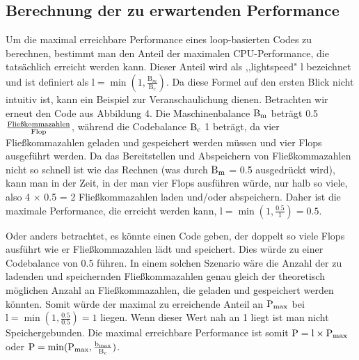 \documentclass[sigconf,language=ngerman]{acmart}
\begin{document}
    \subsection{Berechnung der zu erwartenden Performance}
    Um die maximal erreichbare Performance eines loop-basierten Codes zu berechnen, 
    bestimmt man den Anteil der maximalen CPU-Performance, die tatsächlich erreicht werden kann. 
    Dieser Anteil wird als ,,lightspeed" $\text{l}$ bezeichnet und ist definiert als 
    $\text{l} = \min(1, \frac{\text{B}_{m}}{\text{B}_{c}})$. 
    Da diese Formel auf den ersten Blick nicht intuitiv ist, 
    kann ein Beispiel zur Veranschaulichung dienen. 
    Betrachten wir erneut den Code aus Abbildung 4. 
    Die Maschinenbalance $\textnormal{B}_{\textnormal{m}}$ 
    beträgt 0.5 $\frac{\textnormal{Fließkommazahlen}}{\textnormal{Flop}}$, 
    während die Codebalance $\textnormal{B}_{\textnormal{c}}$ 1 beträgt, 
    da vier Fließkommazahlen geladen und gespeichert werden müssen und vier Flops ausgeführt werden. 
    Da das Bereitstellen und Abspeichern von Fließkommazahlen nicht so schnell ist wie das Rechnen 
    (was durch $\textnormal{B}_{\textnormal{m}}$  = 0.5 ausgedrückt wird), kann man in der Zeit, 
    in der man vier Flops ausführen würde, 
    nur halb so viele, also 4 $\times$ 0.5 = 2 Fließkommazahlen laden und/oder abspeichern.
    Daher ist die maximale Performance, die erreicht werden kann, 
    $\text{l} = \min(1, \frac{0.5}{1}) = 0.5$. 
    
    Oder anders betrachtet, es könnte einen Code geben,
    der doppelt so viele Flops ausführt wie er Fließkommazahlen lädt und speichert. 
    Dies würde zu einer Codebalance von 0.5 führen. 
    In einem solchen Szenario wäre die Anzahl 
    der zu ladenden und speichernden Fließkommazahlen genau gleich der theoretisch möglichen Anzahl
    an Fließkommazahlen, die geladen und gespeichert werden könnten. 
    Somit würde der maximal zu erreichende Anteil an 
    $\textnormal{P}_{\textnormal{max}}$ bei $\text{l} = \min(1, \frac{0.5}{0.5}) = 1$ liegen.  %
    Wenn dieser Wert nah an 1 liegt ist man nicht Speichergebunden.
    Die maximal erreichbare Performance ist somit $\textnormal{P} =  \textnormal{l} \times \textnormal{P}_{\textnormal{max}}$ oder 
    $\textnormal{P} =  \min(\textnormal{P}_{\textnormal{max}}, \frac{\textnormal{b}_{\textnormal{max}}}{\textnormal{B}_{\textnormal{c}}})$.
\end{document}
